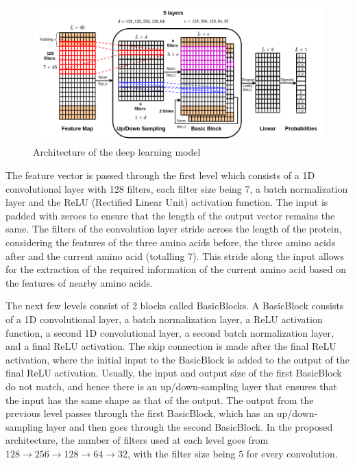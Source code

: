 \documentclass[journal=jacsat,manuscript=article]{achemso}
\begin{document}
\begin{figure}
    \centering
    \noindent\includegraphics[scale=0.5]{architecture}
    \caption{\centering Architecture of the deep learning model}
    \label{fig:architecture}
\end{figure}

The feature vector is passed through the first level which consists of a 1D convolutional layer with 128 filters, each filter size being 7, a batch normalization layer and the ReLU (Rectified Linear Unit) activation function. The input is padded with zeroes to ensure that the length of the output vector remains the same. The filters of the convolution layer stride across the length of the protein, considering the features of the three amino acids before, the three amino acids after and the current amino acid (totalling 7). This stride along the input allows for the extraction of the required information of the current amino acid based on the features of nearby amino acids.

The next few levels consist of 2 blocks called BasicBlocks. A BasicBlock consists of a 1D convolutional layer, a batch normalization layer, a ReLU activation function, a second 1D convolutional layer, a second batch normalization layer, and a final ReLU activation. The skip connection is made after the final ReLU activation, where the initial input to the BasicBlock is added to the output of the final ReLU activation. Usually, the input and output size of the first BasicBlock do not match, and hence there is an up/down-sampling layer that ensures that the input has the same shape as that of the output. The output from the previous level passes through the first BasicBlock, which has an up/down-sampling layer and then goes through the second BasicBlock. In the proposed architecture, the number of filters used at each level goes from $128 \to 256 \to 128 \to 64 \to 32$, with the filter size being 5 for every convolution.
\end{document}
